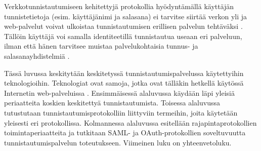 Verkkotunnistautumiseen kehitettyjä protokollia hyödyntämällä käyttäjän tunnistetietoja (esim. käyttäjänimi ja salasana) ei tarvitse siirtää verkon yli ja web-palvelut voivat ulkoistaa tunnistautumisen erillisen palvelun tehtäväksi \cite{nisti}. Tällöin käyttäjä voi samalla identiteetillä tunnistautua useaan eri palveluun, ilman että hänen tarvitsee muistaa palvelukohtaisia tunnus- ja salasanayhdistelmiä \cite{open_identity}.

Tässä luvussa keskitytään keskitetyssä tunnistautumispalvelussa käytettyihin teknologioihin. Teknologiat ovat samoja, jotka ovat tälläkin hetkellä käytössä Internetin web-palveluissa \cite{facebook}. Ensimmäisessä alaluvussa käydään läpi yleisiä periaatteita koskien keskitettyä tunnistautumista. Toisessa alaluvussa tutustutaan tunnistautumisprotokolliin liittyviin termeihin, joita käytetään yleisesti eri protokollissa. Kolmannessa alaluvussa esitellään rajapintaprotokollien toimintaperiaatteita ja tutkitaan SAML- ja OAuth-protokollien soveltuvuutta tunnistautumispalvelun toteutukseen. Viimeinen luku on yhteenvetoluku.
